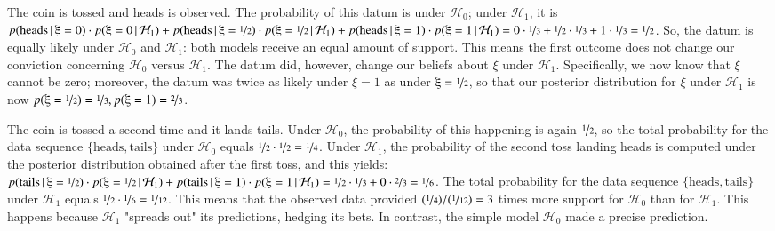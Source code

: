 \documentclass[man]{apa7}
\newcommand{\given}{\, | \,}
\begin{document}
The coin is tossed and heads is observed. The probability of this datum is  under $\mathcal{H}_0$; under $\mathcal{H}_1$, it is $p(\text{heads} \given \xi=0) \cdot p(\xi=0 \given \mathcal{H}_1) + p(\text{heads} \given \xi=\nicefrac{1}{2}) \cdot p(\xi=\nicefrac{1}{2} \given \mathcal{H}_1) + p(\text{heads} \given \xi=1) \cdot p(\xi=1 \given \mathcal{H}_1) = 0 \cdot \nicefrac{1}{3}  + \nicefrac{1}{2} \cdot \nicefrac{1}{3} + 1 \cdot \nicefrac{1}{3} = \nicefrac{1}{2}$. So, the datum is equally likely under $\mathcal{H}_0$ and $\mathcal{H}_1$: both models receive an equal amount of support. This means the first outcome does not change our conviction concerning $\mathcal{H}_0$ versus $\mathcal{H}_1$. The datum did, however, change our beliefs about $\xi$ under $\mathcal{H}_1$. Specifically, we now know that $\xi$ cannot be zero; moreover, the datum was twice as likely under $\xi=1$ as under $\xi = \nicefrac{1}{2}$, so that our posterior distribution for $\xi$ under $\mathcal{H}_1$ is now $p(\xi = \nicefrac{1}{2}) = \nicefrac{1}{3}, p(\xi = 1) = \nicefrac{2}{3}$. 

The coin is tossed a second time and it lands tails. Under $\mathcal{H}_0$, the probability of this happening is again $\nicefrac{1}{2}$, so the total probability for the data sequence $\{\text{heads}, \text{tails}\}$ under $\mathcal{H}_0$ equals $\nicefrac{1}{2} \cdot \nicefrac{1}{2} = \nicefrac{1}{4}$. Under $\mathcal{H}_1$, the probability of the second toss landing heads is computed under the posterior distribution obtained after the first toss, and this yields: $p(\text{tails} \given \xi = \nicefrac{1}{2}) \cdot p(\xi=\nicefrac{1}{2} \given \mathcal{H}_1) + p(\text{tails} \given \xi = 1) \cdot p(\xi=1 \given \mathcal{H}_1) = \nicefrac{1}{2} \cdot \nicefrac{1}{3} + 0 \cdot \nicefrac{2}{3} = \nicefrac{1}{6}$. The total probability for the data sequence $\{\text{heads}, \text{tails}\}$ under $\mathcal{H}_1$ equals $\nicefrac{1}{2} \cdot \nicefrac{1}{6} = \nicefrac{1}{12}$. This means that the observed data provided $(\nicefrac{1}{4}) / (\nicefrac{1}{12}) = 3$ times more support for $\mathcal{H}_0$ than for $\mathcal{H}_1$. This happens because $\mathcal{H}_1$ "spreads out" its predictions, hedging its bets. In contrast, the simple model $\mathcal{H}_0$ made a precise prediction. 
\end{document}
